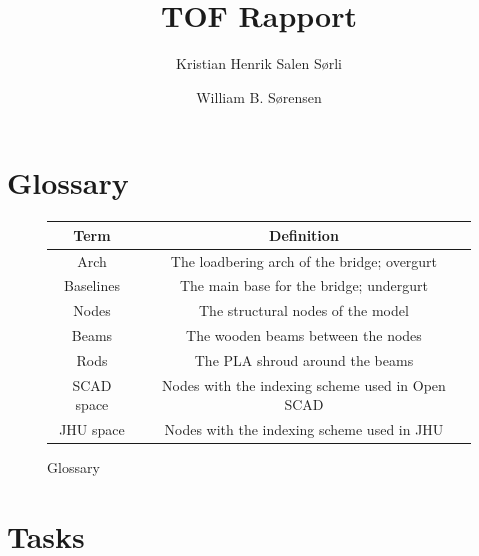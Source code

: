 \documentclass{report}
\author{
  Kristian Henrik Salen Sørli
  \and
  William B. Sørensen\\
}
\title{TOF Rapport}
\begin{document}
\maketitle

\tableofcontents

\chapter{Glossary}

\begin{figure}[H]
	\centering
	\begin{tabular}{|c|c|}
		\hline
		Term       & Definition                                       \\
		\hline
		Arch       & The loadbering arch of the bridge; overgurt      \\
		Baselines  & The main base for the bridge; undergurt          \\
		Nodes      & The structural nodes of the model                \\
		Beams      & The wooden beams between the nodes               \\
		Rods       & The PLA shroud around the beams                  \\
		SCAD space & Nodes with the indexing scheme used in Open SCAD \\
		JHU space  & Nodes with the indexing scheme used in JHU       \\
		\hline
	\end{tabular}
	\caption{Glossary}
\end{figure}

\chapter{Tasks}




\end{document}
